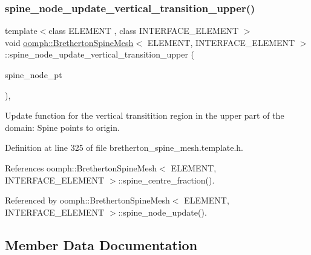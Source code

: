 \mbox{\label{classoomph_1_1BrethertonSpineMesh_a6ddc62166abfd621219551957c9b1103}} 
\subsubsection{\texorpdfstring{spine\+\_\+node\+\_\+update\+\_\+vertical\+\_\+transition\+\_\+upper()}{spine\_node\_update\_vertical\_transition\_upper()}}
{\footnotesize\ttfamily template$<$class E\+L\+E\+M\+E\+NT , class I\+N\+T\+E\+R\+F\+A\+C\+E\+\_\+\+E\+L\+E\+M\+E\+NT $>$ \\
void \hyperlink{classoomph_1_1BrethertonSpineMesh}{oomph\+::\+Bretherton\+Spine\+Mesh}$<$ E\+L\+E\+M\+E\+NT, I\+N\+T\+E\+R\+F\+A\+C\+E\+\_\+\+E\+L\+E\+M\+E\+NT $>$\+::spine\+\_\+node\+\_\+update\+\_\+vertical\+\_\+transition\+\_\+upper (\begin{DoxyParamCaption}\item[{Spine\+Node $\ast$}]{spine\+\_\+node\+\_\+pt }\end{DoxyParamCaption})\hspace{0.3cm}{\ttfamily [inline]}, {\ttfamily [protected]}}



Update function for the vertical transitition region in the upper part of the domain\+: Spine points to origin. 



Definition at line 325 of file bretherton\+\_\+spine\+\_\+mesh.\+template.\+h.



References oomph\+::\+Bretherton\+Spine\+Mesh$<$ E\+L\+E\+M\+E\+N\+T, I\+N\+T\+E\+R\+F\+A\+C\+E\+\_\+\+E\+L\+E\+M\+E\+N\+T $>$\+::spine\+\_\+centre\+\_\+fraction().



Referenced by oomph\+::\+Bretherton\+Spine\+Mesh$<$ E\+L\+E\+M\+E\+N\+T, I\+N\+T\+E\+R\+F\+A\+C\+E\+\_\+\+E\+L\+E\+M\+E\+N\+T $>$\+::spine\+\_\+node\+\_\+update().



\subsection{Member Data Documentation}
\mbox{\label{classoomph_1_1BrethertonSpineMesh_aeb4fa323886ed601b1497777f8e686bc}} 
